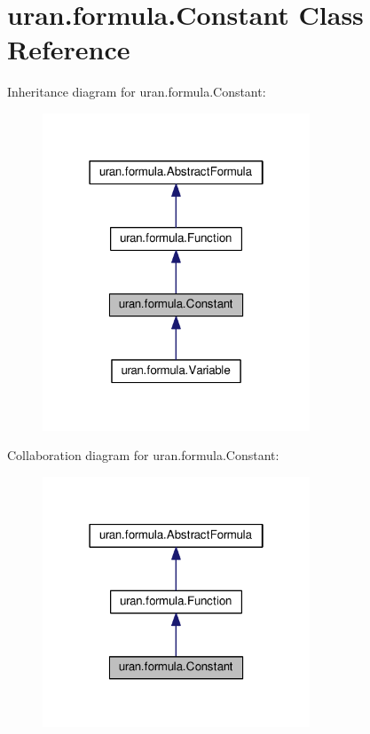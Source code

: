 \hypertarget{classuran_1_1formula_1_1_constant}{}\section{uran.\+formula.\+Constant Class Reference}
\label{classuran_1_1formula_1_1_constant}


Inheritance diagram for uran.\+formula.\+Constant\+:
\nopagebreak
\begin{figure}[H]
\begin{center}
\leavevmode
\includegraphics[width=226pt]{classuran_1_1formula_1_1_constant__inherit__graph}
\end{center}
\end{figure}


Collaboration diagram for uran.\+formula.\+Constant\+:
\nopagebreak
\begin{figure}[H]
\begin{center}
\leavevmode
\includegraphics[width=226pt]{classuran_1_1formula_1_1_constant__coll__graph}
\end{center}
\end{figure}
